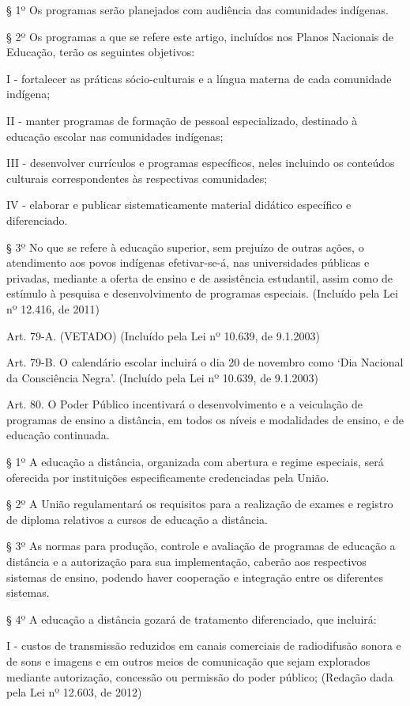 \documentclass[
]{book}
\begin{document}
§ 1º Os programas serão planejados com audiência das comunidades indígenas.

§ 2º Os programas a que se refere este artigo, incluídos nos Planos Nacionais de Educação, terão os seguintes objetivos:

I - fortalecer as práticas sócio-culturais e a língua materna de cada comunidade indígena;

II - manter programas de formação de pessoal especializado, destinado à educação escolar nas comunidades indígenas;

III - desenvolver currículos e programas específicos, neles incluindo os conteúdos culturais correspondentes às respectivas comunidades;

IV - elaborar e publicar sistematicamente material didático específico e diferenciado.

§ 3º No que se refere à educação superior, sem prejuízo de outras ações, o atendimento aos povos indígenas efetivar-se-á, nas universidades públicas e privadas, mediante a oferta de ensino e de assistência estudantil, assim como de estímulo à pesquisa e desenvolvimento de programas especiais. (Incluído pela Lei nº 12.416, de 2011)

Art. 79-A. (VETADO) (Incluído pela Lei nº 10.639, de 9.1.2003)

Art. 79-B. O calendário escolar incluirá o dia 20 de novembro como `Dia Nacional da Consciência Negra'. (Incluído pela Lei nº 10.639, de 9.1.2003)

Art. 80. O Poder Público incentivará o desenvolvimento e a veiculação de programas de ensino a distância, em todos os níveis e modalidades de ensino, e de educação continuada.

§ 1º A educação a distância, organizada com abertura e regime especiais, será oferecida por instituições especificamente credenciadas pela União.

§ 2º A União regulamentará os requisitos para a realização de exames e registro de diploma relativos a cursos de educação a distância.

§ 3º As normas para produção, controle e avaliação de programas de educação a distância e a autorização para sua implementação, caberão aos respectivos sistemas de ensino, podendo haver cooperação e integração entre os diferentes sistemas.

§ 4º A educação a distância gozará de tratamento diferenciado, que incluirá:

I - custos de transmissão reduzidos em canais comerciais de radiodifusão sonora e de sons e imagens e em outros meios de comunicação que sejam explorados mediante autorização, concessão ou permissão do poder público; (Redação dada pela Lei nº 12.603, de 2012)
\end{document}
